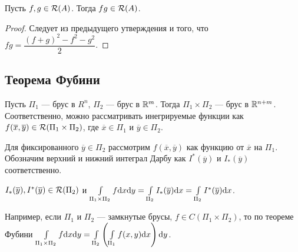 \begin{Statement}
Пусть $f, g \in \mathcal{R}(A)$. Тогда $fg \in \mathcal{R}(A)$.
\end{Statement}
\begin{proof}
Следует из предыдущего утверждения и того, что $fg = \dfrac{(f + g)^2 - f^2 - g^2}{2}$.
\end{proof}

\subsection{Теорема Фубини}
Пусть $\Pi_1$ --- брус в $R^n$, $\Pi_2$ --- брус в $\mathbb{R}^m$. Тогда $\Pi_1 \times \Pi_2$ --- брус в $\mathbb{R}^{n + m}$. Соответственно, можно рассматривать инегрируемые функции как $f(\overline{x}, \overline{y}) \in \mathcal{R}(\Pi_1 \times \Pi_2)$, где $\overline{x} \in \Pi_1$ и $\overline{y} \in \Pi_2$.


Для фиксированного $\overline{y} \in \Pi_2$ рассмотрим $f(\overline{x}, \overline{y})$ как функцию от $\overline{x}$ на $\Pi_1$. Обозначим верхний и нижний интеграл Дарбу как $I^*(\overline{y})$ и $I_*(\overline{y})$ соответственно.

\begin{Theorem}[Фубини]
$I_*(\overline y), I^*(\overline{y}) \in \mathcal{R}(\Pi_2)$ и $\int\limits_{\Pi_1 \times \Pi_2}f\mathrm{d}x\mathrm{d} y = \int\limits_{\Pi_2} I_*(\overline{y})\mathrm{d}x = \int\limits_{\Pi_2} I^*(\overline{y})\mathrm{d}x$.
\end{Theorem}
Например, если $\Pi_1$ и $\Pi_2$ --- замкнутые брусы, $f \in C(\Pi_1 \times \Pi_2)$, то по теореме Фубини $\int\limits_{\Pi_1 \times \Pi_2}f\mathrm{d}x \mathrm{d} y = \int\limits_{\Pi_2}\left( \int\limits_{\Pi_1}f(x, y)\mathrm{d}x\right)  \mathrm{d} y$.

